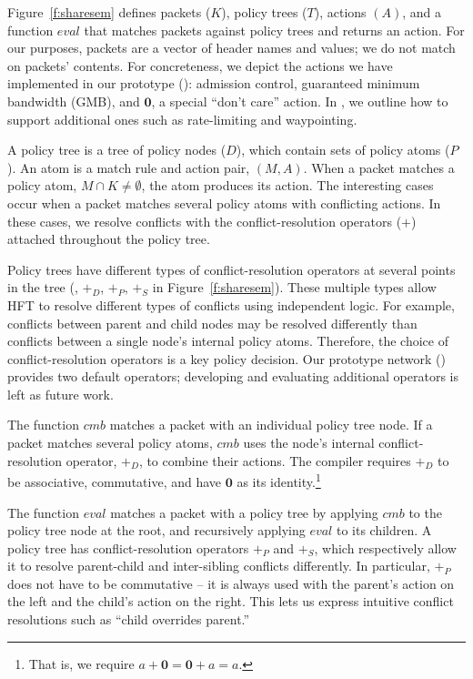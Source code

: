 Figure~\ref{f:sharesem} defines packets ($K$), policy trees ($T$),
actions $(A)$, and a function $\mathit{eval}$ that matches packets
against policy trees and returns an action.  
For our purposes, packets are 
a vector of header names and values; we do not match on packets'
contents. For concreteness, we depict the actions we have implemented in 
our prototype (): admission control, guaranteed
minimum bandwidth (GMB), and $\textbf{0}$, a special ``don't care''
action. In
, we outline how to support additional ones such as
rate-limiting and waypointing.

A policy tree is a tree of policy nodes ($D$), which contain sets of policy
atoms ($P$). An atom is a match rule and action pair, $(M,A)$. When a
packet matches a policy atom, $M \cap K \ne \emptyset$, the atom produces
its action. The interesting cases occur when a packet matches several
policy atoms with conflicting actions. In these cases, we resolve conflicts
with the conflict-resolution operators ($+$) attached throughout the policy tree.

Policy trees have different types of conflict-resolution operators at several
points in the tree (\ie, $+_D$, $+_P$, $+_S$ in Figure~\ref{f:sharesem}). 
These multiple types allow HFT to resolve different types of conflicts using
independent logic. For example, conflicts between parent and child nodes
may be resolved differently than conflicts between a single node's internal
policy atoms.
Therefore, the choice of conflict-resolution operators is a key policy decision.
Our prototype network () provides two default operators;
developing and evaluating additional operators is left as future work.

The function $\mathit{cmb}$ matches a packet with an individual policy
tree node. If a packet matches several policy atoms,
$\mathit{cmb}$ uses the node's internal conflict-resolution operator, $+_D$,
to combine their actions. The compiler
requires $+_D$ to be associative, commutative, and have $\textbf{0}$
as its identity.\footnote{That is, we require $a + \textbf{0} =
  \textbf{0} + a = a$.}

The function $\mathit{eval}$ matches a packet with a policy tree by
applying $\mathit{cmb}$ to the policy tree node at the root, and
recursively applying $\mathit{eval}$ to its children. A policy tree
has conflict-resolution operators $+_P$ and $+_S$, which respectively allow
it to resolve parent-child and inter-sibling conflicts differently. In
particular, $+_P$ does not have to be commutative -- it is always used
with the parent's action on the left and the child's action on the
right. This lets us express intuitive conflict resolutions such as ``child overrides
parent.''


